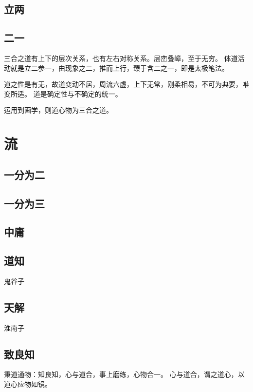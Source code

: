 \subsection{立两}

\subsection{二一}

三合之道有上下的层次关系，也有左右对称关系。层峦叠嶂，至于无穷。
体道活动就是立二参一，由现象之二，推而上行，臻于含二之一，即是太极笔法。

道之性是有无，故道变动不居，周流六虚，上下无常，刚柔相易，不可为典要，唯变所适。
道是确定性与不确定的统一。

运用到画学，则道心物为三合之道。

\section{流}

\subsection{一分为二}

\subsection{一分为三}

\subsection{中庸}

\subsection{道知}

鬼谷子

\subsection{天解}

淮南子

\subsection{致良知}

秉道通物：知良知，心与道合，事上磨练，心物合一。
心与道合，谓之道心，以道心应物如镜。

